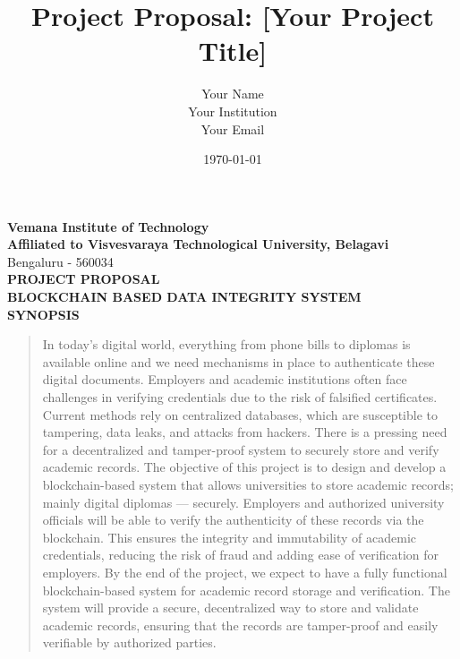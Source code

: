\documentclass[a4paper,12pt]{article}
\title{\textbf{Project Proposal: [Your Project Title]}}
\author{Your Name \\ Your Institution \\ Your Email}
\date{\today}
\begin{document}
\begin{center}

    {\Large \textbf{Vemana Institute of Technology} \\[0.2em]}
    \textbf{Affiliated to Visvesvaraya Technological University, Belagavi}\\[0.2em]{Bengaluru - 560034}\\[3em]

    {\fontsize{20}{0}\selectfont\textbf{PROJECT PROPOSAL}} \\[1em]
    {\fontsize{15}{0}\selectfont\textbf{BLOCKCHAIN BASED DATA INTEGRITY SYSTEM}} \\[3em]
    
    {\fontsize{12}{0}\textbf{SYNOPSIS}} \\[0.5em]
    \begin{quote}
      \small
      In today's digital world, everything from phone bills to diplomas is available online and we need mechanisms in place to authenticate these digital documents. 
      Employers and academic institutions often face challenges in verifying credentials due to the risk of falsified certificates. 
      Current methods rely on centralized databases, which are susceptible to tampering, data leaks, and attacks from hackers. 
      There is a pressing need for a decentralized and tamper-proof system to securely store and verify academic records.\newline \newline
      The objective of this project is to design and develop a blockchain-based system that allows universities to store academic records; mainly digital diplomas — securely.
      Employers and authorized university officials will be able to verify the authenticity of these records via the blockchain. 
      This ensures the integrity and immutability of academic credentials, reducing the risk of fraud and adding ease of verification for employers. \newline \newline
      By the end of the project, we expect to have a fully functional blockchain-based system for academic record storage and verification. 
      The system will provide a secure, decentralized way to store and validate academic records, ensuring that the records are tamper-proof and easily verifiable by authorized parties.
    \end{quote}


\end{center}
\end{document}
